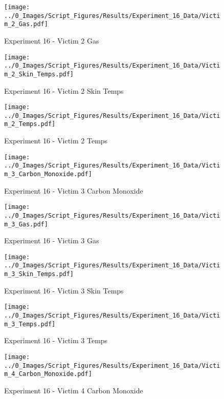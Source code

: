 	\begin{figure}[H]
		\centering
		\texttt{[image: ../0\_Images/Script\_Figures/Results/Experiment\_16\_Data/Victim\_2\_Gas.pdf]}
		\caption[]{Experiment 16 - Victim 2 Gas}
	\end{figure}
 
	\clearpage

	\begin{figure}[H]
		\centering
		\texttt{[image: ../0\_Images/Script\_Figures/Results/Experiment\_16\_Data/Victim\_2\_Skin\_Temps.pdf]}
		\caption[]{Experiment 16 - Victim 2 Skin Temps}
	\end{figure}
 

	\begin{figure}[H]
		\centering
		\texttt{[image: ../0\_Images/Script\_Figures/Results/Experiment\_16\_Data/Victim\_2\_Temps.pdf]}
		\caption[]{Experiment 16 - Victim 2 Temps}
	\end{figure}
 
	\clearpage

	\begin{figure}[H]
		\centering
		\texttt{[image: ../0\_Images/Script\_Figures/Results/Experiment\_16\_Data/Victim\_3\_Carbon\_Monoxide.pdf]}
		\caption[]{Experiment 16 - Victim 3 Carbon Monoxide}
	\end{figure}
 

	\begin{figure}[H]
		\centering
		\texttt{[image: ../0\_Images/Script\_Figures/Results/Experiment\_16\_Data/Victim\_3\_Gas.pdf]}
		\caption[]{Experiment 16 - Victim 3 Gas}
	\end{figure}
 
	\clearpage

	\begin{figure}[H]
		\centering
		\texttt{[image: ../0\_Images/Script\_Figures/Results/Experiment\_16\_Data/Victim\_3\_Skin\_Temps.pdf]}
		\caption[]{Experiment 16 - Victim 3 Skin Temps}
	\end{figure}
 

	\begin{figure}[H]
		\centering
		\texttt{[image: ../0\_Images/Script\_Figures/Results/Experiment\_16\_Data/Victim\_3\_Temps.pdf]}
		\caption[]{Experiment 16 - Victim 3 Temps}
	\end{figure}
 
	\clearpage

	\begin{figure}[H]
		\centering
		\texttt{[image: ../0\_Images/Script\_Figures/Results/Experiment\_16\_Data/Victim\_4\_Carbon\_Monoxide.pdf]}
		\caption[]{Experiment 16 - Victim 4 Carbon Monoxide}
	\end{figure}
 

